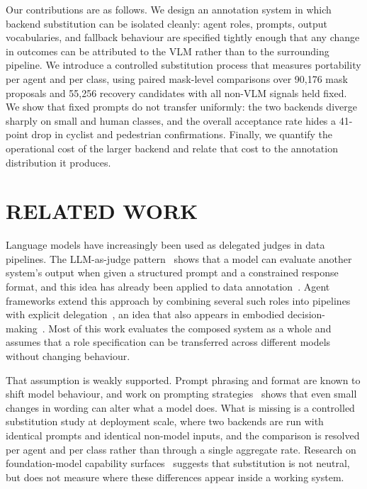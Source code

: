 \documentclass[a4paper,twoside]{article}
\begin{document}
Our contributions are as follows.
We design an annotation system in which backend substitution can be isolated cleanly: agent roles, prompts, output vocabularies, and fallback behaviour are specified tightly enough that any change in outcomes can be attributed to the VLM rather than to the surrounding pipeline.
We introduce a controlled substitution process that measures portability per agent and per class, using paired mask-level comparisons over 90{,}176 mask proposals and 55{,}256 recovery candidates with all non-VLM signals held fixed.
We show that fixed prompts do not transfer uniformly: the two backends diverge sharply on small and human classes, and the overall acceptance rate hides a 41-point drop in cyclist and pedestrian confirmations.
Finally, we quantify the operational cost of the larger backend and relate that cost to the annotation distribution it produces.


\section{\uppercase{Related Work}}

Language models have increasingly been used as delegated judges in data pipelines.  
The LLM-as-judge pattern~\cite{zheng2023judging,gu2024judgesurvey} shows that a model can evaluate another system’s output when given a structured prompt and a constrained response format, and this idea has already been applied to data annotation~\cite{gilardi2023chatgptannotator,li2023llmdata}.  
Agent frameworks extend this approach by combining several such roles into pipelines with explicit delegation~\cite{xi2023agents,schick2023toolformer,wang2023voyager}, an idea that also appears in embodied decision-making~\cite{ahn2022saycan,huang2023inner,brohan2023rt2}.  
Most of this work evaluates the composed system as a whole and assumes that a role specification can be transferred across different models without changing behaviour.

That assumption is weakly supported.  
Prompt phrasing and format are known to shift model behaviour, and work on prompting strategies~\cite{wei2022chain} shows that even small changes in wording can alter what a model does.  
What is missing is a controlled substitution study at deployment scale, where two backends are run with identical prompts and identical non-model inputs, and the comparison is resolved per agent and per class rather than through a single aggregate rate.  
Research on foundation-model capability surfaces~\cite{bommasani2021opportunities} suggests that substitution is not neutral, but does not measure where these differences appear inside a working system.
\end{document}
